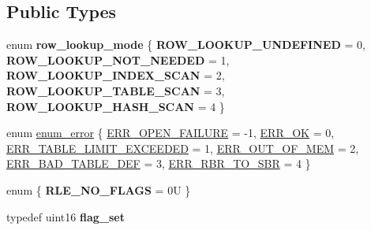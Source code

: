 \subsection*{Public Types}
\begin{DoxyCompactItemize}
\item 
\mbox{\label{classRows__log__event_a842cc94e78b6d6bef8aa1afcca57ce34}} 
enum {\bfseries row\+\_\+lookup\+\_\+mode} \{ \newline
{\bfseries R\+O\+W\+\_\+\+L\+O\+O\+K\+U\+P\+\_\+\+U\+N\+D\+E\+F\+I\+N\+ED} = 0, 
{\bfseries R\+O\+W\+\_\+\+L\+O\+O\+K\+U\+P\+\_\+\+N\+O\+T\+\_\+\+N\+E\+E\+D\+ED} = 1, 
{\bfseries R\+O\+W\+\_\+\+L\+O\+O\+K\+U\+P\+\_\+\+I\+N\+D\+E\+X\+\_\+\+S\+C\+AN} = 2, 
{\bfseries R\+O\+W\+\_\+\+L\+O\+O\+K\+U\+P\+\_\+\+T\+A\+B\+L\+E\+\_\+\+S\+C\+AN} = 3, 
\newline
{\bfseries R\+O\+W\+\_\+\+L\+O\+O\+K\+U\+P\+\_\+\+H\+A\+S\+H\+\_\+\+S\+C\+AN} = 4
 \}
\item 
enum \mbox{\hyperlink{classRows__log__event_ad4f2f3d052f398cc4f3c32731a4f9b35}{enum\+\_\+error}} \{ \newline
\mbox{\hyperlink{classRows__log__event_ad4f2f3d052f398cc4f3c32731a4f9b35a5c3ee63b59eb0f85d9905cf16cd5fe0d}{E\+R\+R\+\_\+\+O\+P\+E\+N\+\_\+\+F\+A\+I\+L\+U\+RE}} = -\/1, 
\mbox{\hyperlink{classRows__log__event_ad4f2f3d052f398cc4f3c32731a4f9b35af994b76723251df6f2b0f76743327f8b}{E\+R\+R\+\_\+\+OK}} = 0, 
\mbox{\hyperlink{classRows__log__event_ad4f2f3d052f398cc4f3c32731a4f9b35a2a1190a85f5bb2c869db9ab5b82df2d5}{E\+R\+R\+\_\+\+T\+A\+B\+L\+E\+\_\+\+L\+I\+M\+I\+T\+\_\+\+E\+X\+C\+E\+E\+D\+ED}} = 1, 
\mbox{\hyperlink{classRows__log__event_ad4f2f3d052f398cc4f3c32731a4f9b35af6ebe31503925effbdecbbbae5de1e7e}{E\+R\+R\+\_\+\+O\+U\+T\+\_\+\+O\+F\+\_\+\+M\+EM}} = 2, 
\newline
\mbox{\hyperlink{classRows__log__event_ad4f2f3d052f398cc4f3c32731a4f9b35a3dd54ac0b82e441cb929d5fdc750777b}{E\+R\+R\+\_\+\+B\+A\+D\+\_\+\+T\+A\+B\+L\+E\+\_\+\+D\+EF}} = 3, 
\mbox{\hyperlink{classRows__log__event_ad4f2f3d052f398cc4f3c32731a4f9b35a94e3965ec001edd2757d41fd002eb4e9}{E\+R\+R\+\_\+\+R\+B\+R\+\_\+\+T\+O\+\_\+\+S\+BR}} = 4
 \}
\item 
\mbox{\label{classRows__log__event_ab2ff758ce7b922afa57a9987f4c784ce}} 
enum \{ {\bfseries R\+L\+E\+\_\+\+N\+O\+\_\+\+F\+L\+A\+GS} = 0U
 \}
\item 
\mbox{\label{classRows__log__event_a82c506b223533da9b973eb235032d022}} 
typedef uint16 {\bfseries flag\+\_\+set}
\end{DoxyCompactItemize}

